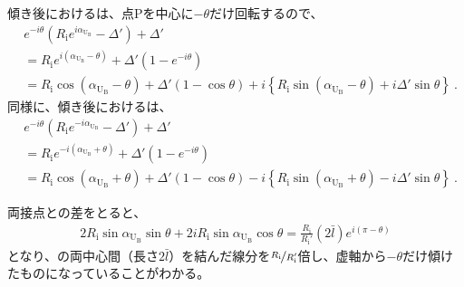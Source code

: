 \subsubsection{\AfterRotatePlateContactPoint}
傾き後における\TopSideReceiverPlateContactPoint は、点Pを中心に$-\theta$だけ回転するので、
\begin{align*}
  &  e^{-i\theta}\left(R_\mathrm ie^{i\alpha_{\mathrm U_\mathrm B}}-\Delta'\right)+\Delta'\\
  &= R_\mathrm ie^{i(\alpha_{\mathrm U_\mathrm B}-\theta)}+\Delta'\!\left(1-e^{-i\theta}\right)\\
  &= R_\mathrm i\cos(\alpha_{\mathrm U_\mathrm B}-\theta)+\Delta'(1-\cos\theta)
     +i\left\{R_\mathrm i\sin(\alpha_{\mathrm U_\mathrm B}-\theta)+i\Delta'\sin\theta\right\}\ .
\end{align*}
同様に、傾き後における\BottomSideReceiverPlateContactPoint は、
\begin{align*}
  &  e^{-i\theta}\left(R_\mathrm ie^{-i\alpha_{\mathrm U_\mathrm B}}-\Delta'\right)+\Delta'\\
  &= R_\mathrm ie^{-i(\alpha_{\mathrm U_\mathrm B}+\theta)}+\Delta'\!\left(1-e^{-i\theta}\right)\\
  &= R_\mathrm i\cos(\alpha_{\mathrm U_\mathrm B}+\theta)+\Delta'(1-\cos\theta)
     -i\left\{R_\mathrm i\sin(\alpha_{\mathrm U_\mathrm B}+\theta)-i\Delta'\sin\theta\right\}\ .
\end{align*}
\begin{hosoku}
両接点との差をとると、
\begin{align*}
  2R_\mathrm i\sin\alpha_{\mathrm U_\mathrm B}\sin\theta+2iR_\mathrm i\sin\alpha_{\mathrm U_\mathrm B}\cos\theta
  = \frac{R_\mathrm i}{R_\mathrm i'}(2\bar l)e^{i(\pi-\theta)}
\end{align*}
となり、\ReceiverPlate の両中心間（長さ$2\bar l$）を結んだ線分を$\nicefrac{R_\mathrm i}{R_\mathrm i'}$倍し、虚軸から$-\theta$だけ傾けたものになっていることがわかる。
\end{hosoku}


